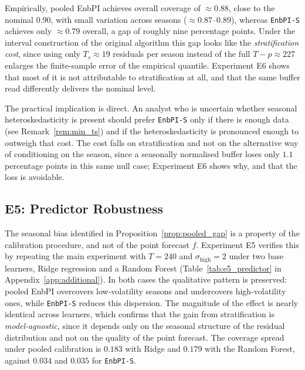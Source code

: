 Empirically, pooled EnbPI achieves overall coverage of
$\approx 0.88$, close to the nominal $0.90$, with small variation
across seasons ($\approx 0.87$--$0.89$), whereas \texttt{EnbPI-S}
achieves only $\approx 0.79$ overall, a gap of roughly nine
percentage points.  Under the interval construction of the original
algorithm this gap looks like the \emph{stratification cost}, since
using only $T_s \approx 19$ residuals per season instead of the full
$T - p \approx 227$ enlarges the finite-sample error of the empirical
quantile.  Experiment E6 shows that most of it is not attributable to
stratification at all, and that the same buffer read differently
delivers the nominal level.

The practical implication is direct.  An analyst who is uncertain
whether seasonal heteroskedasticity is present should prefer
\texttt{EnbPI-S} only if there is enough data (see
Remark~\ref{rem:min_ts}) and if the heteroskedasticity is pronounced
enough to outweigh that cost.  The cost falls on stratification and
not on the alternative way of conditioning on the season, since a
seasonally normalised buffer loses only $1.1$ percentage points in
this same null case; Experiment E6 shows why, and that the loss is
avoidable.

\subsection{E5: Predictor Robustness}
\label{sec:simulations:e5}

The seasonal bias identified in Proposition~\ref{prop:pooled_gap}
is a property of the calibration procedure, and not of the point
forecast $\hat{f}$.  Experiment E5 verifies this by repeating the
main experiment with $T = 240$ and $\sigma_{\mathrm{high}} = 2$
under two base learners, Ridge regression and a Random Forest
(Table~\ref{tab:e5_predictor} in Appendix~\ref{app:additional}).
In both cases the qualitative pattern is preserved: pooled EnbPI
overcovers low-volatility seasons and undercovers high-volatility
ones, while \texttt{EnbPI-S} reduces this dispersion.  The magnitude
of the effect is nearly identical across learners, which confirms
that the gain from stratification is \emph{model-agnostic}, since it
depends only on the seasonal structure of the residual distribution
and not on the quality of the point forecast.  The coverage spread
under pooled calibration is $0.183$ with Ridge and $0.179$ with the
Random Forest, against $0.034$ and $0.035$ for \texttt{EnbPI-S}.

